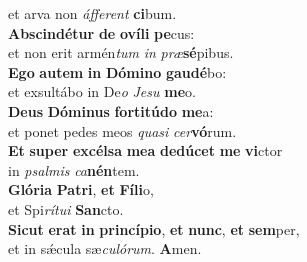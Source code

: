 \evenverse et arva non \textit{áf}\textit{fe}\textit{rent} \textbf{ci}bum.\\
\oddverse \textbf{Ab}\textbf{scin}\textbf{dé}\textbf{tur} \textbf{de} \textbf{o}\textbf{ví}\textbf{li} \textbf{pe}cus:~\*\\
\oddverse et non erit armén\textit{tum} \textit{in} \textit{præ}\textbf{sé}pibus.\\
\evenverse \textbf{E}\textbf{go} \textbf{au}\textbf{tem} \textbf{in} \textbf{Dó}\textbf{mi}\textbf{no} \textbf{gau}\textbf{dé}bo:~\*\\
\evenverse et exsultábo in De\textit{o} \textit{Je}\textit{su} \textbf{me}o.\\
\oddverse \textbf{De}\textbf{us} \textbf{Dó}\textbf{mi}\textbf{nus} \textbf{for}\textbf{ti}\textbf{tú}\textbf{do} \textbf{me}a:~\*\\
\oddverse et ponet pedes meos \textit{qua}\textit{si} \textit{cer}\textbf{vó}rum.\\
\evenverse \textbf{Et} \textbf{su}\textbf{per} \textbf{ex}\textbf{cél}\textbf{sa} \textbf{me}\textbf{a} \textbf{de}\textbf{dú}\textbf{cet} \textbf{me} \textbf{vi}ctor~\*\\
\evenverse in \textit{psal}\textit{mis} \textit{ca}\textbf{nén}tem.\\
\oddverse \textbf{Gló}\textbf{ri}\textbf{a} \textbf{Pa}\textbf{tri}, \textbf{et} \textbf{Fí}\textbf{li}o,~\*\\
\oddverse et Spi\textit{rí}\textit{tu}\textit{i} \textbf{San}cto.\\
\evenverse \textbf{Si}\textbf{cut} \textbf{e}\textbf{rat} \textbf{in} \textbf{prin}\textbf{cí}\textbf{pi}\textbf{o}, \textbf{et} \textbf{nunc}, \textbf{et} \textbf{sem}per,~\*\\
\evenverse et in sǽcula sæ\textit{cu}\textit{ló}\textit{rum}. \textbf{A}men.\\
